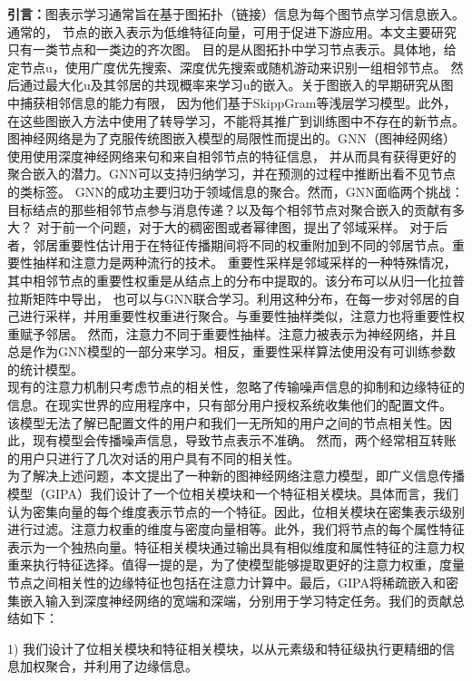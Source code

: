 \documentclass{article}
\begin{document}
\textbf{引言：}图表示学习通常旨在基于图拓扑（链接）信息为每个图节点学习信息嵌入。通常的，
节点的嵌入表示为低维特征向量，可用于促进下游应用。本文主要研究只有一类节点和一类边的齐次图。
目的是从图拓扑中学习节点表示。具体地，给定节点u，使用广度优先搜索、深度优先搜索或随机游动来识别一组相邻节点。
然后通过最大化u及其邻居的共现概率来学习u的嵌入。关于图嵌入的早期研究从图中捕获相邻信息的能力有限，
因为他们基于SkippGram等浅层学习模型。此外，在这些图嵌入方法中使用了转导学习，不能将其推广到训练图中不存在的新节点。\\
图神经网络是为了克服传统图嵌入模型的局限性而提出的。GNN（图神经网络）使用使用深度神经网络来句和来自相邻节点的特征信息，
并从而具有获得更好的聚合嵌入的潜力。GNN可以支持归纳学习，并在预测的过程中推断出看不见节点的类标签。
GNN的成功主要归功于领域信息的聚合。然而，GNN面临两个挑战：目标结点的那些相邻节点参与消息传递？以及每个相邻节点对聚合嵌入的贡献有多大？
对于前一个问题，对于大的稠密图或者幂律图，提出了邻域采样。
对于后者，邻居重要性估计用于在特征传播期间将不同的权重附加到不同的邻居节点。重要性抽样和注意力是两种流行的技术。
重要性采样是邻域采样的一种特殊情况，其中相邻节点的重要性权重是从结点上的分布中提取的。该分布可以从归一化拉普拉斯矩阵中导出，
也可以与GNN联合学习。利用这种分布，在每一步对邻居的自己进行采样，并用重要性权重进行聚合。与重要性抽样类似，注意力也将重要性权重赋予邻居。
然而，注意力不同于重要性抽样。注意力被表示为神经网络，并且总是作为GNN模型的一部分来学习。相反，重要性采样算法使用没有可训练参数的统计模型。\\
现有的注意力机制只考虑节点的相关性，忽略了传输噪声信息的抑制和边缘特征的信息。在现实世界的应用程序中，只有部分用户授权系统收集他们的配置文件。
该模型无法了解已配置文件的用户和我们一无所知的用户之间的节点相关性。因此，现有模型会传播噪声信息，导致节点表示不准确。
然而，两个经常相互转账的用户只进行了几次对话的用户具有不同的相关性。\\
为了解决上述问题，本文提出了一种新的图神经网络注意力模型，即广义信息传播模型（GIPA）我们设计了一个位相关模块和一个特征相关模块。具体而言，我们认为密集向量的每个维度表示节点的一个特征。因此，位相关模块在密集表示级别进行过滤。注意力权重的维度与密度向量相等。此外，我们将节点的每个属性特征表示为一个独热向量。特征相关模块通过输出具有相似维度和属性特征的注意力权重来执行特征选择。值得一提的是，为了使模型能够提取更好的注意力权重，度量节点之间相关性的边缘特征也包括在注意力计算中。最后，GIPA将稀疏嵌入和密集嵌入输入到深度神经网络的宽端和深端，分别用于学习特定任务。我们的贡献总结如下：

1) 我们设计了位相关模块和特征相关模块，以从元素级和特征级执行更精细的信息加权聚合，并利用了边缘信息。
\end{document}
